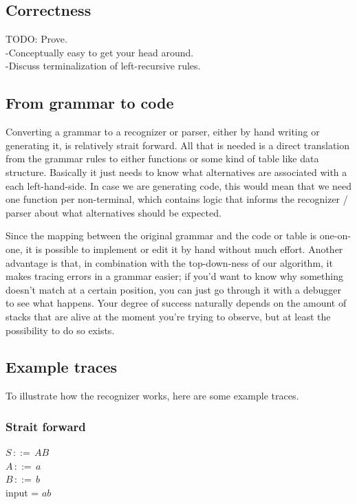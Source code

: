 \documentclass[a4paper,10pt]{article}
\begin{document}
\subsection{Correctness}

TODO: Prove.\\
-Conceptually easy to get your head around.\\
-Discuss terminalization of left-recursive rules.

\subsection{From grammar to code}

Converting a grammar to a recognizer or parser, either by hand writing or generating it, is relatively strait forward. All that is needed is a direct translation from the grammar rules to either functions or some kind of table like data structure. Basically it just needs to know what alternatives are associated with a each left-hand-side. In case we are generating code, this would mean that we need one function per non-terminal, which contains logic that informs the recognizer / parser about what alternatives should be expected.

Since the mapping between the original grammar and the code or table is one-on-one, it is possible to implement or edit it by hand without much effort. Another advantage is that, in combination with the top-down-ness of our algorithm, it makes tracing errors in a grammar easier; if you'd want to know why something doesn't match at a certain position, you can just go through it with a debugger to see what happens. Your degree of success naturally depends on the amount of stacks that are alive at the moment you're trying to observe, but at least the possibility to do so exists.

\subsection{Example traces}

To illustrate how the recognizer works, here are some example traces.

\subsubsection{Strait forward}
$S\,::=\,AB$\\
$A\,::=\,a$\\
$B\,::=\,b$\\
input = $ab$
\end{document}
